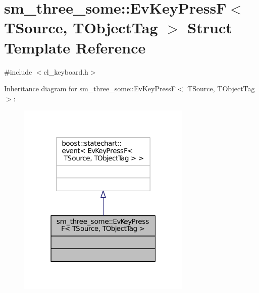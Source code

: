 \hypertarget{structsm__three__some_1_1EvKeyPressF}{}\section{sm\+\_\+three\+\_\+some\+:\+:Ev\+Key\+PressF$<$ T\+Source, T\+Object\+Tag $>$ Struct Template Reference}
\label{structsm__three__some_1_1EvKeyPressF}


{\ttfamily \#include $<$cl\+\_\+keyboard.\+h$>$}



Inheritance diagram for sm\+\_\+three\+\_\+some\+:\+:Ev\+Key\+PressF$<$ T\+Source, T\+Object\+Tag $>$\+:
\nopagebreak
\begin{figure}[H]
\begin{center}
\leavevmode
\includegraphics[width=235pt]{structsm__three__some_1_1EvKeyPressF__inherit__graph}
\end{center}
\end{figure}


